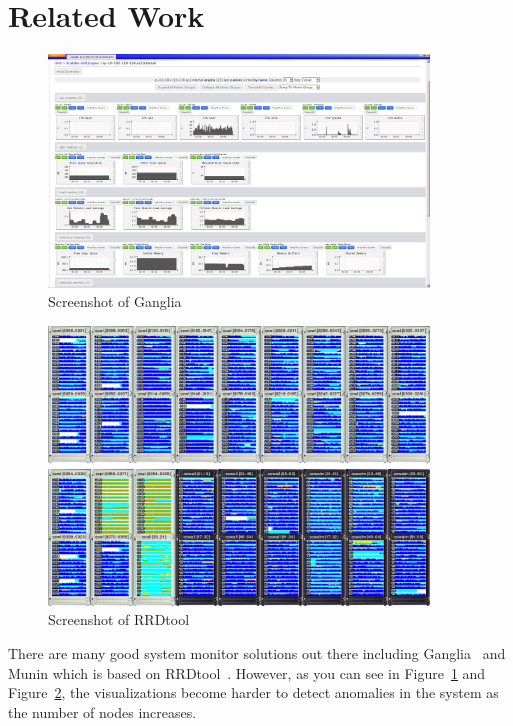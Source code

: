 \documentclass[conference]{style/acmsiggraph}
\begin{document}
\section{Related Work}

\begin{figure}[p]
    \centering
    \includegraphics[width=0.9\textwidth]{images/ganglia.png}
    \caption{Screenshot of Ganglia\protect\footnotemark}
    \label{fig:ganglia}
\end{figure}
\begin{figure}[p]
    \centering
    \includegraphics[width=0.9\textwidth]{images/rrdtool.png}
    \caption{Screenshot of RRDtool\protect\footnotemark}
    \label{fig:rrdtool}
\end{figure}

There are many good system monitor solutions out there including Ganglia~\cite{Massie04} and Munin
which is based on RRDtool~\cite{Oetiker99}. However, as you can see in Figure~\ref{fig:ganglia} and
Figure~\ref{fig:rrdtool}, the visualizations become harder to detect anomalies in the system as the
number of nodes increases.
\end{document}
